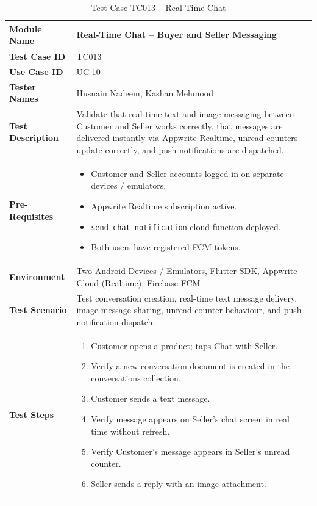 \begin{table}[H]
\centering
\caption{Test Case TC013 -- Real-Time Chat}
\label{tab:tc013}
\renewcommand{\arraystretch}{1.15}
\small
\begin{tabular}{|p{3.2cm}|p{10.8cm}|}
\hline
\textbf{Module Name} & Real-Time Chat -- Buyer and Seller Messaging \\ \hline
\textbf{Test Case ID} & TC013 \\ \hline
\textbf{Use Case ID} & UC-10 \\ \hline
\textbf{Tester Names} & Husnain Nadeem, Kashan Mehmood \\ \hline
\textbf{Test Description} & Validate that real-time text and image messaging between Customer and Seller works correctly, that messages are delivered instantly via Appwrite Realtime, unread counters update correctly, and push notifications are dispatched. \\ \hline
\textbf{Pre-Requisites} &
\begin{itemize}[leftmargin=*,noitemsep]
\item Customer and Seller accounts logged in on separate devices / emulators.
\item Appwrite Realtime subscription active.
\item \texttt{send-chat-notification} cloud function deployed.
\item Both users have registered FCM tokens.
\end{itemize} \\ \hline
\textbf{Environment} & Two Android Devices / Emulators, Flutter SDK, Appwrite Cloud (Realtime), Firebase FCM \\ \hline
\textbf{Test Scenario} & Test conversation creation, real-time text message delivery, image message sharing, unread counter behaviour, and push notification dispatch. \\ \hline
\textbf{Test Steps} &
\begin{enumerate}[leftmargin=*,noitemsep]
\item Customer opens a product; taps Chat with Seller.
\item Verify a new conversation document is created in the conversations collection.
\item Customer sends a text message.
\item Verify message appears on Seller's chat screen in real time without refresh.
\item Verify Customer's message appears in Seller's unread counter.
\item Seller sends a reply with an image attachment.

\end{enumerate}
\end{tabular}
\end{table}
